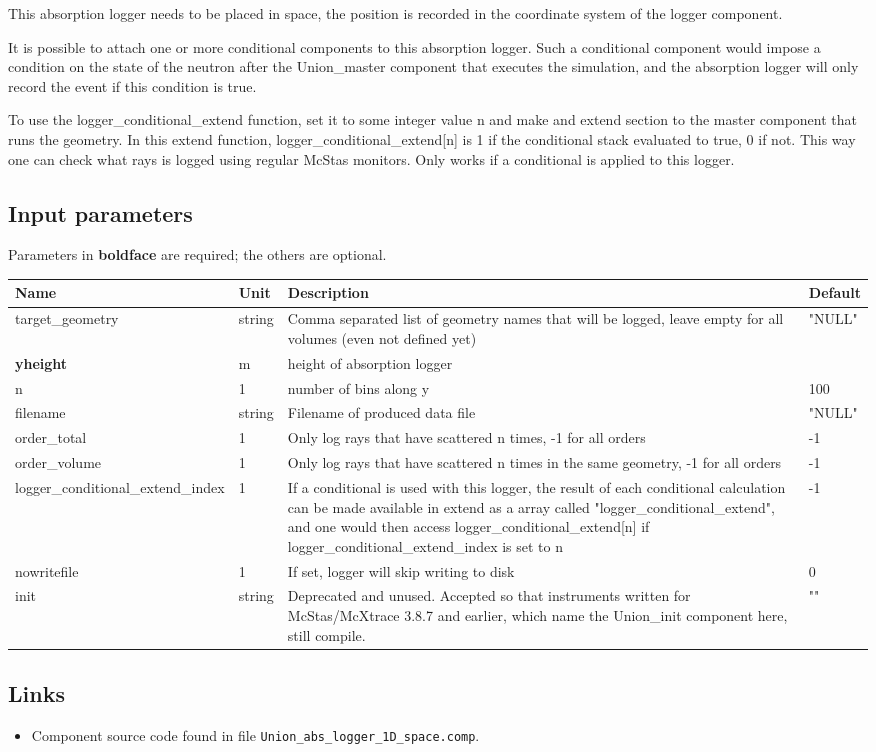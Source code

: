 This absorption logger needs to be placed in space, the position is recorded in the coordinate system of the logger component.

It is possible to attach one or more conditional components to this absorption logger. Such a conditional component would impose a condition on the state of the neutron after the Union\_master component that executes the simulation, and the absorption logger will only record the event if this condition is true.

To use the logger\_conditional\_extend function, set it to some integer value n and make and extend section to the master component that runs the geometry. In this extend function, logger\_conditional\_extend[n] is 1 if the conditional stack evaluated to true, 0 if not. This way one can check what rays is logged using regular McStas monitors. Only works if a conditional is applied to this logger.

\subsection*{Input parameters}
Parameters in \textbf{boldface} are required; the others are optional.

\begin{longtable}{p{}p{}p{}p{}}
\toprule
\textbf{Name} & \textbf{Unit} & \textbf{Description} & \textbf{Default} \\
\midrule
\endhead
target\_geometry & string & Comma separated list of geometry names that will be logged, leave empty for all volumes (even not defined yet) & "NULL" \\
\textbf{yheight} & m & height of absorption logger &  \\
n & 1 & number of bins along y & 100 \\
filename & string & Filename of produced data file & "NULL" \\
order\_total & 1 & Only log rays that have scattered n times, -1 for all orders & -1 \\
order\_volume & 1 & Only log rays that have scattered n times in the same geometry, -1 for all orders & -1 \\
logger\_conditional\_extend\_index & 1 & If a conditional is used with this logger, the result of each conditional calculation can be made available in extend as a array called "logger\_conditional\_extend", and one would then access logger\_conditional\_extend[n] if logger\_conditional\_extend\_index is set to n & -1 \\
nowritefile & 1 & If set, logger will skip writing to disk & 0 \\
init & string & Deprecated and unused. Accepted so that instruments written for McStas/McXtrace 3.8.7 and earlier, which name the Union\_init component here, still compile. & "" \\
\bottomrule
\end{longtable}

\subsection*{Links}
\begin{itemize}
  \item Component source code found in file \texttt{Union\_abs\_logger\_1D\_space.comp}.
\end{itemize}

